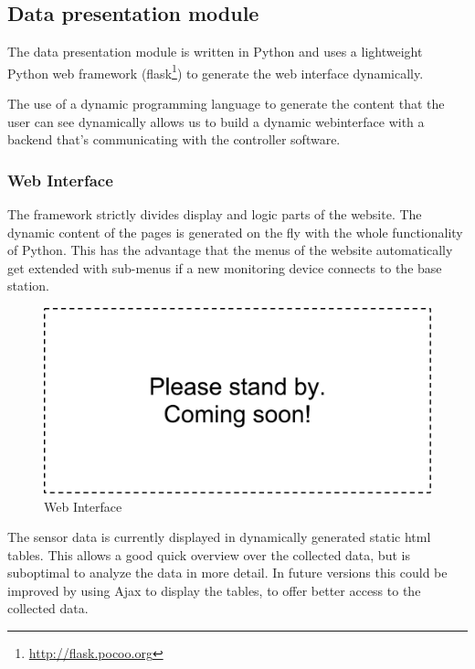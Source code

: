 \subsection{Data presentation module}
The data presentation module is written in Python and uses a lightweight Python web framework (flask\footnote{\url{http://flask.pocoo.org}}) to generate the web interface dynamically. 

The use of a dynamic programming language to generate the content that the user can see dynamically allows us to build a dynamic webinterface with a backend that’s communicating with the controller software. 

\subsubsection*{Web Interface}
The framework strictly divides display and logic parts of the website. The dynamic content of the pages is generated on the fly with the whole functionality of Python. This has the advantage that the menus of the website automatically get extended with sub-menus if a new monitoring device connects to the base station. 

\begin{figure}
\includegraphics[width=\textwidth]{Images/dummy}
\caption{Web Interface}
\label{fig:web_interface}
\end{figure}

The sensor data is currently displayed in dynamically generated static html tables. This allows a good quick overview over the collected data, but is suboptimal to analyze the data in more detail. In future versions this could be improved by using Ajax to display the tables, to offer better access to the collected data.









